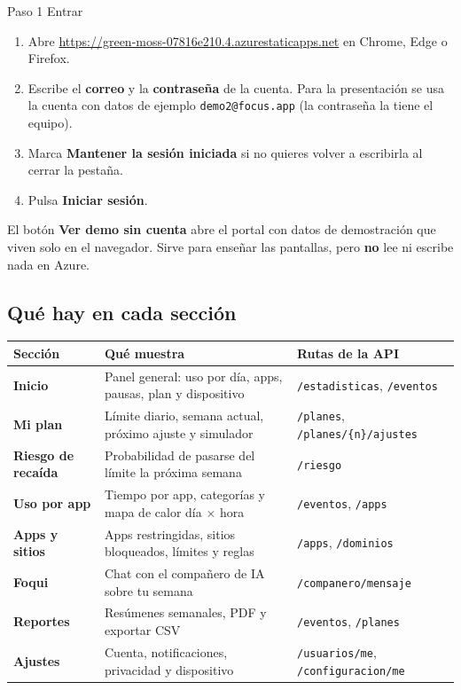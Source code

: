 \documentclass[11pt,a4paper]{article}
\newcommand{\ruta}[1]{\texttt{\color{marino}#1}}
\newcommand{\menu}[1]{\textsf{\textbf{#1}}}
\begin{document}
\begin{paso}{Paso 1 \textperiodcentered{} Entrar}
\begin{enumerate}[leftmargin=*]
  \item Abre \url{https://green-moss-07816e210.4.azurestaticapps.net} en Chrome, Edge o Firefox.
  \item Escribe el \textbf{correo} y la \textbf{contraseña} de la cuenta. Para la presentación se usa la cuenta
        con datos de ejemplo \texttt{demo2@focus.app} (la contraseña la tiene el equipo).
  \item Marca \menu{Mantener la sesión iniciada} si no quieres volver a escribirla al cerrar la pestaña.
  \item Pulsa \menu{Iniciar sesión}.
\end{enumerate}
\end{paso}

\begin{nota}
El botón \menu{Ver demo sin cuenta} abre el portal con datos de demostración que viven solo en el
navegador. Sirve para enseñar las pantallas, pero \textbf{no} lee ni escribe nada en Azure.
\end{nota}

\subsection{Qué hay en cada sección}

\begin{center}
\renewcommand{\arraystretch}{1.2}
\begin{tabularx}{\textwidth}{>{\bfseries}l X l}
\toprule
Sección & Qué muestra & Rutas de la API \\
\midrule
Inicio & Panel general: uso por día, apps, pausas, plan y dispositivo & \ruta{/estadisticas}, \ruta{/eventos} \\
Mi plan & Límite diario, semana actual, próximo ajuste y simulador & \ruta{/planes}, \ruta{/planes/\{n\}/ajustes} \\
Riesgo de recaída & Probabilidad de pasarse del límite la próxima semana & \ruta{/riesgo} \\
Uso por app & Tiempo por app, categorías y mapa de calor día $\times$ hora & \ruta{/eventos}, \ruta{/apps} \\
Apps y sitios & Apps restringidas, sitios bloqueados, límites y reglas & \ruta{/apps}, \ruta{/dominios} \\
Foqui & Chat con el compañero de IA sobre tu semana & \ruta{/companero/mensaje} \\
Reportes & Resúmenes semanales, PDF y exportar CSV & \ruta{/eventos}, \ruta{/planes} \\
Ajustes & Cuenta, notificaciones, privacidad y dispositivo & \ruta{/usuarios/me}, \ruta{/configuracion/me} \\
\bottomrule
\end{tabularx}
\end{center}
\end{document}

